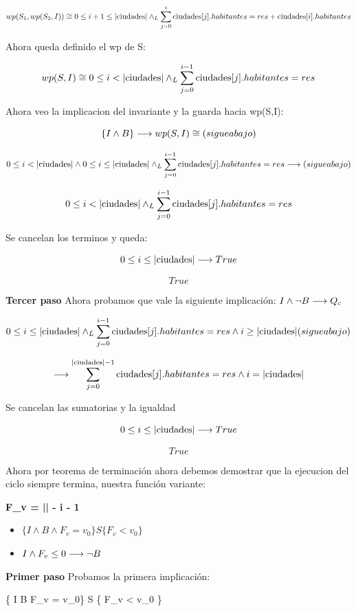\documentclass[10pt,a4paper]{article}
\begin{document}
\[
wp(S_1, wp(S_2, I)) \cong 0 \leq i+1 \leq |\text{ciudades}| \land _L \sum_{j=0}^{i} \text{ciudades}[j].habitantes = res + \text{ciudades}[i].habitantes
\]

Ahora queda definido el wp de S:

\[
wp(S, I) \cong 0 \leq i < |\text{ciudades}| \land _L \sum_{j=0}^{i-1} \text{ciudades}[j].habitantes = res
\]

Ahora veo la implicacion del invariante y la guarda hacia wp(S,I):

\[
\{I \land B\} \longrightarrow wp(S, I) \cong (sigue abajo)
\]

\[
 0 \leq i < |\text{ciudades}| \land 0 \leq i \leq |\text{ciudades}| \land _L \sum_{j=0}^{i-1} \text{ciudades}[j].habitantes = res \longrightarrow (sigue abajo)
\]

\[
0 \leq i < |\text{ciudades}| \land _L \sum_{j=0}^{i-1} \text{ciudades}[j].habitantes = res
\]

Se cancelan los terminos y queda:

\[
0 \leq i \leq |\text{ciudades}| \longrightarrow True
\]

\[
True
\]

\textbf{Tercer paso} Ahora probamos que vale la siguiente implicación:
\( I \land \neg B \longrightarrow Q_c \)

\[
0 \leq i \leq |\text{ciudades}| \land _L \sum_{j=0}^{i-1} \text{ciudades}[j].habitantes = res \land i \geq |\text{ciudades}| (sigue abajo)
\]

\[
\longrightarrow \sum_{j=0}^{|\text{ciudades}|-1} \text{ciudades}[j].habitantes = res \land i = |\text{ciudades}|
\]

Se cancelan las sumatorias y la igualdad

\[
0 \leq i \leq |\text{ciudades}| \longrightarrow True
\]

\[
True
\]

Ahora por teorema de terminación ahora debemos demostrar que la ejecucion del ciclo siempre termina, nuestra función variante:

\textbf{F_v = || - i - 1}

\begin{itemize}
    \item \( \{ I \land B \land F_v = v_0\} S \{ F_v < v_0 \} \)
    \item \( I \land F_v \leq 0 \longrightarrow \neg B \)
\end{itemize}

\textbf{Primer paso} Probamos la primera implicación:

\{ I \land B \land F_v = v_0\} S \{ F_v < v_0 \}
\end{document}
